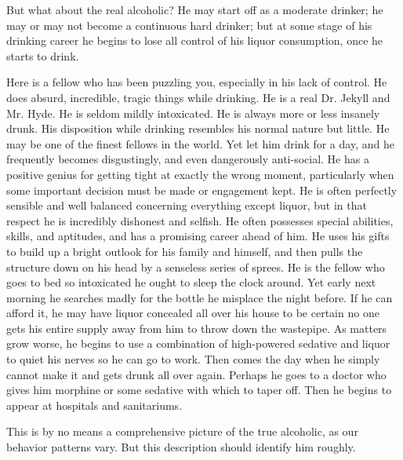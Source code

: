 \begin{biblechapter}
    But what about the real alcoholic? 
\verse He may start off as a moderate drinker; 
    he may or may not become a continuous hard drinker; 
    but at some stage of his drinking career 
    he begins to lose all control of his liquor consumption, 
    once he starts to drink.

\verse Here is a fellow who has been puzzling you, 
    especially in his lack of control. 
\verse He does absurd, incredible, tragic things while drinking. 
\verse He is a real Dr. Jekyll and Mr. Hyde. 
\verse He is seldom mildly intoxicated. 
\verse He is always more or less insanely drunk. 
\verse His disposition while drinking 
    resembles his normal nature but little. 
\verse He may be one of the finest fellows in the world. 
\verse Yet let him drink for a day, 
    and he frequently becomes disgustingly, 
    and even dangerously anti-social. 
\verse He has a positive genius for 
    getting tight at exactly the wrong moment, 
    particularly when some important decision must be made 
    or engagement kept. 
\verse He is often perfectly sensible and well balanced 
    concerning everything except liquor, 
    but in that respect he is incredibly dishonest and selfish. 
\verse He often possesses special abilities, skills, and aptitudes, 
    and has a promising career ahead of him. 
\verse He uses his gifts to build up a bright outlook 
    for his family and himself, 
    and then pulls the structure down on his head 
    by a senseless series of sprees. 
\verse He is the fellow who goes to bed so intoxicated 
    he ought to sleep the clock around. 
\verse Yet early next morning he searches madly 
    for the bottle he misplace the night before. 
\verse If he can afford it, 
    he may have liquor concealed all over his house 
    to be certain no one gets his entire supply away from him 
    to throw down the wastepipe. 
\verse As matters grow worse, 
    he begins to use a combination of high-powered sedative and liquor 
    to quiet his nerves so he can go to work. 
\verse Then comes the day when he simply cannot make it 
    and gets drunk all over again. 
\verse Perhaps he goes to a doctor who gives him morphine 
    or some sedative with which to taper off. 
\verse Then he begins to appear at hospitals and sanitariums.

\verse This is by no means a comprehensive picture of the true alcoholic, 
    as our behavior patterns vary. 
\verse But this description should identify him roughly.
\end{biblechapter}



